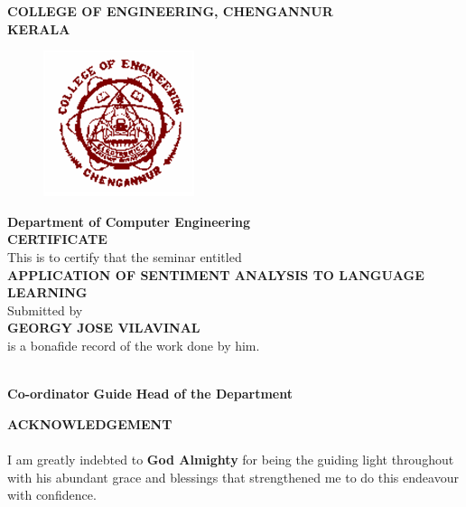 \documentclass[a4paper,12pt,oneside]{article}
\begin{document}
\newpage
\thispagestyle{empty}
\begin{center}
\setlength{\baselineskip}{1.5\baselineskip}
{\large\textbf{COLLEGE OF ENGINEERING, CHENGANNUR}}
\\
{\large\textbf{KERALA}}
\\
\begin{figure}[H]
\centering
\includegraphics{ceclogo.png}
\end{figure}
\setlength{\baselineskip}{1.5\baselineskip}
\textbf{Department of Computer Engineering}
\\
\textbf{CERTIFICATE}
\\
This is to certify that the seminar entitled
\\
\textbf{APPLICATION OF SENTIMENT ANALYSIS TO LANGUAGE LEARNING}
\\
Submitted by
\\
\textbf{GEORGY JOSE VILAVINAL}
\\
is a bonafide record of the work done by him.
\end{center}
\vspace{30ex}
\hspace{55ex}
\\

\hspace{0ex}
\textbf{Co-ordinator}
\hspace{16ex}
\textbf{Guide}
\hspace{16ex}
\textbf{Head of the Department}
\newpage
{}
\renewcommand{\headrulewidth}{0.0pt}
\renewcommand{\footrulewidth}{0.0pt}
\begin{center}
\large{\textbf{ACKNOWLEDGEMENT}}
\end{center}
\vspace{6ex}
\setlength{\baselineskip}{1.5\baselineskip}
\paragraph{}
I am greatly indebted to \textbf{God Almighty} for being the guiding light throughout with his
abundant grace and blessings that strengthened me to do this endeavour with confidence.
\end{document}
